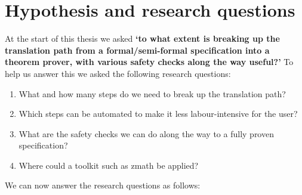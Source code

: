 \section{Hypothesis and research questions}

At the start of this thesis we asked
\textbf{`to what extent is breaking up the translation path from a
formal/semi-formal specification into a theorem prover, with various
safety checks along the way useful?'}
To help us answer this we asked the following research questions:

\begin{enumerate}
    \item What and how many steps do we need to break up the translation path?
    \item Which steps can be automated to make it less labour-intensive for the user?
    \item What are the safety checks we can do along the way to a fully proven specification?
    \item Where could a toolkit such as \gls{zmath} be applied?
\end{enumerate}

We can now answer the research questions as follows:

